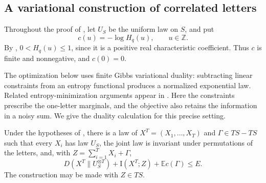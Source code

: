 \subsection{A variational construction of correlated letters}

Throughout the proof of , let $U_S$ be the uniform
law on $S$, and put
\[
 c(u)=-\log H_q(u),\qquad u\in\mathbb Z.
\]
By , $0<H_q(u)\le1$, since it is a
positive real characteristic coefficient.  Thus $c$ is finite and
nonnegative, and $c(0)=0$.

The optimization below uses finite Gibbs variational duality: subtracting
linear constraints from an entropy functional produces a normalized
exponential law. Related entropy-minimization arguments appear in
\cite[Section~2.1]{Lee2017}. Here the constraints prescribe the one-letter
marginals, and the objective also retains the information in a noisy sum.
We give the duality calculation for this precise setting.

\begin{lemma}
\label{entropy-foundations:variational}
Under the hypotheses of , there is a law of
$X^T=(X_1,\ldots,X_T)$ and $\Gamma\in TS-TS$ such that every $X_i$ has law
$U_S$, the joint law is invariant under permutations of the letters, and,
with $Z=\sum_{i=1}^T X_i+\Gamma$,
\begin{equation}
\label{eq:source-1}
 D(X^T\|U_S^{\otimes T})+\mathrm I(X^T;Z)
       +\mathbb E c(\Gamma)\le E.
\end{equation}
The construction may be made with $Z\in TS$.
\end{lemma}

